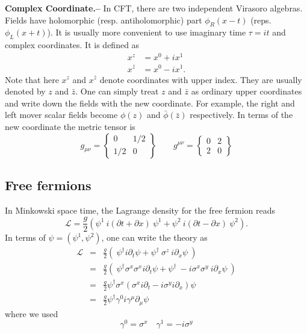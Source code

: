 \documentclass[submission, PhysLectNotes]{SciPost}
\begin{document}
{\bf Complex Coordinate.--}  In CFT, there are two independent Virasoro algebras. Fields have holomorphic (resp. antiholomorphic) part $\phi_R(x-t)$ (reps. $\phi_L(x+t)$). It is usually more convenient to use imaginary time $\tau = it$ and complex coordinates. It is defined as 
\begin{equation}
\begin{aligned}
x^z &= x^0 + i x^1 \\
x^{\bar{z}} &= x^0 - i x^1.
\end{aligned}
\end{equation}  
Note that here $x^z$ and $x^{\bar{z}}$ denote coordinates with upper index. They are usually denoted by $z$ and $\bar{z}$. One can simply treat $z$ and $\bar{z}$ as ordinary upper coordinates and write down the fields with the new coordinate. For example, the right and left mover scalar fields become $\phi(z)$ and $\bar{\phi}(\bar{z})$ respectively. In terms of the new coordinate the metric tensor is
\begin{equation}
	g_{\mu\nu} = \begin{Bmatrix}
        0    & 1/2  \\
        1/2  & 0     
    \end{Bmatrix} \qquad
	g^{\mu\nu} = \begin{Bmatrix}
        0 & 2  \\
        2 & 0
    \end{Bmatrix}
\end{equation}

\subsection{Free fermions}
In Minkowski space time, the Lagrange density for the free fermion reads
\begin{equation}
    \mathcal{L} = \frac{g}{2}\left(\psi^1\ i(\partial t + \partial x)\ \psi^1 + \psi^2\ i(\partial t - \partial x)\ \psi^2 \right).
\end{equation}
In terms of $\psi = (\psi^1,\psi^2)$, one can write the theory as
\begin{eqnarray}
    \mathcal{L} &=& \frac{g}{2} \left ( \ \psi^\dagger i\partial_t \psi + \psi^\dagger \ \sigma^z \ i\partial_x \psi \ \right) \nonumber \\
    &=& \frac{g}{2} \left ( \ \psi^\dagger \sigma^x\sigma^x i\partial_t \psi + \psi^\dagger \ -i\sigma^x\sigma^y \ i\partial_x \psi \ \right) \nonumber\\
    &=& \frac{g}{2} \psi^\dagger \sigma^x \left(\sigma^x i \partial_t - i\sigma^y i\partial_x \right) \psi \nonumber \\
    &=& \frac{g}{2} \psi^\dagger \gamma^0 i\gamma^\mu \partial_\mu \psi
\end{eqnarray}
where we used
\begin{equation}
    \gamma^0 = \sigma^x \quad \gamma^1 = -i\sigma^y
\end{equation}
\end{document}
